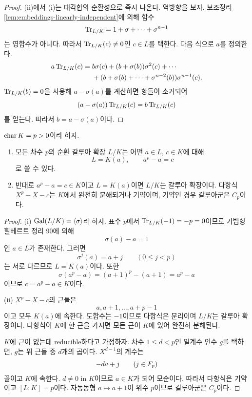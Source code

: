 \begin{proof}
(ii)에서 (i)는 대각합의 순환성으로 즉시 나온다. 역방향을 보자. 보조정리 \ref{lem:embeddings-linearly-independent}에 의해 함수
\[
  \operatorname{Tr}_{L/K}=1+\sigma+\cdots+\sigma^{n-1}
\]
는 영함수가 아니다. 따라서 $\operatorname{Tr}_{L/K}(c)\ne0$인 $c\in L$를 택한다. 다음 식으로 $a$를 정의한다.
\[
\begin{aligned}
 a\operatorname{Tr}_{L/K}(c)={}&b\sigma(c)
 +(b+\sigma(b))\sigma^2(c)+\cdots\\
 &+(b+\sigma(b)+\cdots+\sigma^{n-2}(b))
 \sigma^{n-1}(c).
\end{aligned}
\]
$\operatorname{Tr}_{L/K}(b)=0$을 사용해 $a-\sigma(a)$를 계산하면 항들이 소거되어
\[
  (a-\sigma(a))\operatorname{Tr}_{L/K}(c)
  =b\operatorname{Tr}_{L/K}(c)
\]
를 얻는다. 따라서 $b=a-\sigma(a)$이다.
\end{proof}

\begin{theorem}
\label{thm:artin-schreier-cyclic}
$\operatorname{char} K=p>0$이라 하자.
\begin{enumerate}[label=(\roman*)]
  \item 모든 차수 $p$의 순환 갈루아 확장 $L/K$는 어떤 $a\in L$, $c\in K$에 대해
  \[
    L=K(a),
    \qquad
    a^p-a=c
  \]
  로 쓸 수 있다.
  \item 반대로 $a^p-a=c\in K$이고 $L=K(a)$이면 $L/K$는 갈루아 확장이다. 다항식 $X^p-X-c$는 $K$에서 완전히 분해되거나 기약이며, 기약인 경우 갈루아군은 $C_p$이다.
\end{enumerate}
\end{theorem}

\begin{proof}
(i) $\operatorname{Gal}(L/K)=\langle\sigma\rangle$라 하자. 표수 $p$에서 $\operatorname{Tr}_{L/K}(-1)=-p=0$이므로 가법형 힐베르트 정리 90에 의해
\[
  \sigma(a)-a=1
\]
인 $a\in L$가 존재한다. 그러면
\[
  \sigma^j(a)=a+j
  \qquad(0\le j<p)
\]
는 서로 다르므로 $L=K(a)$이다. 또한
\[
  \sigma(a^p-a)=(a+1)^p-(a+1)=a^p-a
\]
이므로 $c=a^p-a\in K$이다.

(ii) $X^p-X-c$의 근들은
\[
  a,a+1,\dots,a+p-1
\]
이고 모두 $K(a)$에 속한다. 도함수는 $-1$이므로 다항식은 분리이며 $L/K$는 갈루아 확장이다. 다항식이 $K$에 한 근을 가지면 모든 근이 $K$에 있어 완전히 분해된다.

$K$에 근이 없는데 reducible하다고 가정하자. 차수 $1\le d<p$인 일계수 인수 $g$를 택하면, $g$는 위 근들 중 $d$개의 곱이다. $X^{d-1}$의 계수는
\[
  -da+j
  \qquad(j\in F_p)
\]
꼴이고 $K$에 속한다. $d\ne0$ in $K$이므로 $a\in K$가 되어 모순이다. 따라서 다항식은 기약이고 $[L:K]=p$이다. 자동동형 $a\mapsto a+1$이 위수 $p$이므로 갈루아군은 $C_p$이다.
\end{proof}

